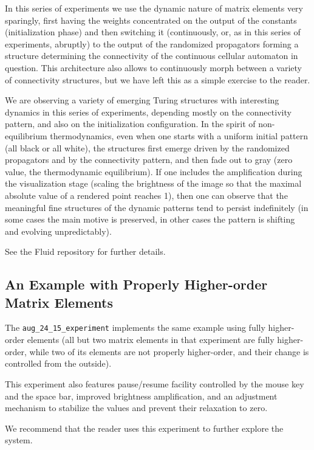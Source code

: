 \documentclass[withtimes]{easychair}
\begin{document}
In this series of experiments we use the dynamic nature of matrix elements very
sparingly, first having the weights concentrated on the output of the constants
(initialization phase) and then switching it (continuously, or, as in this series
of experiments, abruptly) to the output of the randomized propagators
forming a structure determining the connectivity
of the continuous cellular automaton in question. This architecture also allows to
continuously morph between a variety of connectivity structures, but
we have left this as a simple exercise to the reader.

We are observing a variety of emerging Turing structures with interesting dynamics
in this series of experiments, depending mostly on the connectivity pattern,
and also on the initialization configuration. In the spirit of non-equilibrium
thermodynamics, even when one starts with a uniform
initial pattern (all black or all white), the structures first emerge driven by the randomized propagators
and by the connectivity pattern, and then fade out to gray (zero value, the thermodynamic
equilibrium). If one includes the amplification during the visualization stage
(scaling the brightness of the image so that the maximal absolute value of a rendered point reaches 1),
then one can observe that the meaningful fine structures of the dynamic patterns
tend to persist indefinitely (in some cases the main motive is preserved, in
other cases the pattern is shifting and evolving unpredictably).

See the Fluid repository for further details.

\subsection{An Example with Properly Higher-order Matrix Elements}

The {\tt aug\_24\_15\_experiment} implements the same example using fully higher-order elements
(all but two matrix elements in that experiment are fully higher-order, while two of its elements are not properly
higher-order, and their change is controlled from the outside).

This experiment also features pause/resume facility controlled by the mouse key and the
space bar, improved brightness amplification, and an adjustment mechanism to stabilize the values
and prevent their relaxation to zero.

We recommend that the reader uses this experiment to further explore the system.
\end{document}
